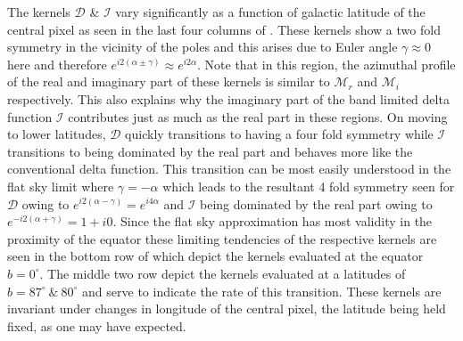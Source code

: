 %
The kernels $\mathcal{D}$ \& $\mathcal{I}$ vary significantly as a function of galactic latitude of the central pixel as seen in the last four columns of . These kernels show a two fold symmetry in the vicinity of the poles and this arises due to Euler angle $\gamma \approx 0$ here and therefore $e^{i2(\alpha \pm \gamma)} \approx e^{i2\alpha}$. Note that in this region, the azimuthal profile of the real and imaginary part of these kernels  is similar to $\mathcal{M}_r$ and $\mathcal{M}_i$ respectively.  This also explains why the imaginary part of the band limited delta function $\mathcal{I}$ contributes just as much as the real part in these regions. On moving to lower latitudes, $\mathcal{D}$ quickly transitions to having a four fold symmetry while $\mathcal{I}$ transitions to being dominated by the real part and behaves more like the conventional delta function. This transition can be most easily understood in the flat sky limit where $\gamma = -\alpha$ which leads to the resultant 4 fold symmetry seen for $\mathcal{D}$ owing to $e^{i2(\alpha - \gamma)} =e^{i4\alpha}$ and $\mathcal{I}$ being dominated by the real part owing to $e^{-i2(\alpha + \gamma)} =1 + i0$. Since the flat sky approximation has most validity in the proximity of the equator these limiting tendencies of the respective kernels are seen in the bottom row of  which depict the kernels evaluated at the equator $b=0^{\circ}$. The middle two row depict the kernels evaluated at a latitudes of $b=87^{\circ}~\&~ 80^{\circ}$ and serve to indicate the rate of this transition. These kernels are invariant under changes in longitude of the central pixel, the latitude being held fixed, as one may have expected.

